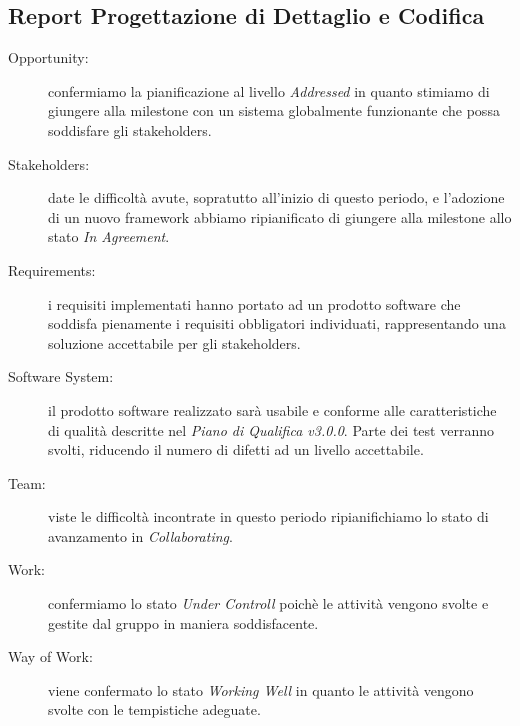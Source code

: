 \subsection{Report Progettazione di Dettaglio e Codifica}
\begin{description}
	\item[Opportunity:] confermiamo la pianificazione al livello \textit{Addressed} in quanto stimiamo di giungere alla \gls{milestone} con un sistema globalmente funzionante che possa soddisfare gli \gls{stakeholders}.
	\item[Stakeholders:] date le difficoltà avute, sopratutto all'inizio di questo periodo, e l'adozione di un nuovo \gls{framework} abbiamo ripianificato di giungere alla \gls{milestone} allo stato \textit{In Agreement}.
	\item[Requirements:] i requisiti implementati hanno portato ad un prodotto software che soddisfa pienamente i requisiti obbligatori individuati, rappresentando una soluzione accettabile per gli \gls{stakeholders}. 
	\item[Software System:] il prodotto software realizzato sarà usabile e conforme alle caratteristiche di qualità descritte nel \textit{Piano di Qualifica v3.0.0}. Parte dei test verranno svolti, riducendo il numero di difetti ad un livello accettabile.
	\item[Team:] viste le difficoltà incontrate in questo periodo ripianifichiamo lo stato di avanzamento in \textit{Collaborating}.
	\item[Work:] confermiamo lo stato \textit{Under Controll} poichè le attività vengono svolte e gestite dal gruppo in maniera soddisfacente.
	\item[Way of Work:] viene confermato lo stato \textit{Working Well} in quanto le attività vengono svolte con le tempistiche adeguate. 
\end{description}